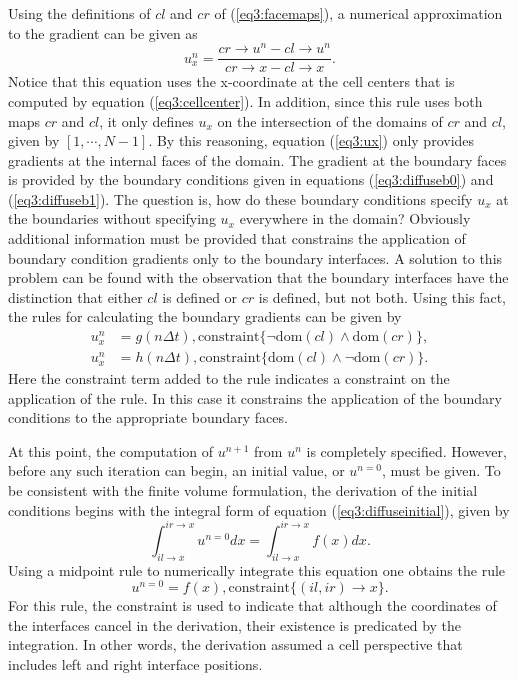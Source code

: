 \documentclass[10pt,epsf]{book}
\begin{document}
Using the definitions of $cl$ and $cr$ of (\ref{eq3:facemaps}), a
numerical approximation to the gradient can be given as
\begin{equation}
u_x^n = \frac{cr\rightarrow u^n - cl\rightarrow u^n}
           {cr\rightarrow x - cl\rightarrow x}.
\label{eq3:ux}
\end{equation}
Notice that this equation uses the x-coordinate at the cell centers
that is computed by equation (\ref{eq3:cellcenter}).  In addition,
since this rule uses both maps $cr$ and $cl$, it only defines $u_x$ on
the intersection of the domains of $cr$ and $cl$, given by $[1, \cdots,
N-1]$.  By this reasoning, equation (\ref{eq3:ux}) only provides
gradients at the internal faces of the domain.  The gradient at the
boundary faces is provided by the boundary conditions given in
equations (\ref{eq3:diffuseb0}) and (\ref{eq3:diffuseb1}).  The
question is, how do these boundary conditions specify $u_x$ at the
boundaries without specifying $u_x$ everywhere in the domain?
Obviously additional information must be provided that constrains
the application of boundary condition gradients only to the boundary
interfaces.  A solution to this problem can be found with the
observation that the boundary interfaces have the distinction that
either $cl$ is defined or $cr$ is defined, but not both.  Using this
fact, the rules for calculating the boundary gradients can be given by
\begin{equation}
\begin{aligned}
u_x^n & = g(n \Delta t), \mbox{constraint}\lbrace \neg \mathrm{dom}(cl) \wedge
\mathrm{dom}(cr) \rbrace, \label{eq3:brule0}\\
u_x^n & = h(n \Delta t), \mbox{constraint}\lbrace \mathrm{dom}(cl)
\wedge \neg \mathrm{dom}(cr) \rbrace. %
\end{aligned}
\end{equation}
Here the constraint term added to the rule indicates a constraint on
the application of the rule.  In this case it constrains the
application of the boundary conditions to the appropriate boundary faces.

At this point, the computation of $u^{n+1}$ from $u^n$ is completely
specified.  However, before any such iteration can begin, an initial
value, or $u^{n=0}$, must be given.  To be consistent with the finite
volume formulation, the derivation of the initial conditions begins
with the integral form of equation (\ref{eq3:diffuseinitial}), given by
\begin{equation}
\int^{ir\rightarrow x}_{il\rightarrow x} u^{n=0} dx =
\int^{ir\rightarrow x}_{il\rightarrow x} f(x) dx.
\end{equation}
Using a midpoint rule to numerically integrate this equation one
obtains the rule
\begin{equation}
u^{n=0} = f(x), \mbox{constraint}\lbrace (il,ir)\rightarrow x\rbrace.
\label{eq3:ic}
\end{equation}
For this rule, the constraint is used to indicate that although the
coordinates of the interfaces cancel in the derivation, their
existence is predicated by the integration.  In other words, the
derivation assumed a cell perspective that includes left and right
interface positions.
\end{document}
